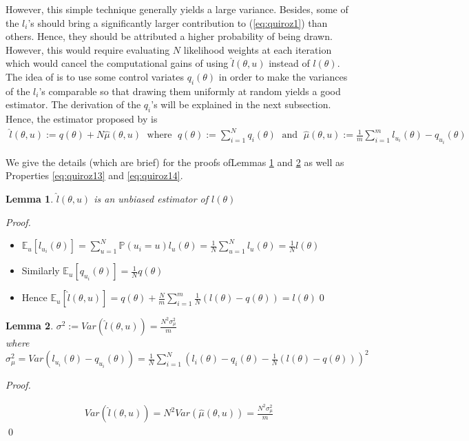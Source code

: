 \documentclass[11pt,a4paper]{report}\usepackage[]{graphicx}\usepackage[]{color}
\newtheorem{lemma}{Lemma}[section]
\begin{document}
However, this simple technique generally yields a large variance. Besides, some of the $l_i$'s should bring a significantly larger contribution to (\ref{eq:quiroz1}) than others. Hence, they should be attributed a higher probability of being drawn. However, this would require evaluating $N$ likelihood weights at each iteration which would cancel the computational gains of using $\hat l(\theta,u)$ instead of $l(\theta)$. The idea of \cite{quiroz2018speeding} is to use some control variates $q_i(\theta)$ in order to make the variances of the $l_i$'s comparable so that drawing them uniformly at random yields a good estimator. The derivation of the $q_i$'s will be explained in the next subsection.\\
Hence, the estimator proposed by \cite{quiroz2018speeding} is 
\begin{align}
\label{eq:quiroz3}
\hat l(\theta,u):= q(\theta) + N\hat\mu(\theta,u)\; \text{ where }\; q(\theta):=\sum_{i=1}^N q_i(\theta)\; \text{ and }\; \hat\mu(\theta,u):=\frac{1}{m}\sum_{i=1}^m l_{u_i}(\theta)-q_{u_i}(\theta)
\end{align}

We give the details (which are brief) for the proofs ofLemmas \ref{eq:quiroz11} and \ref{eq:quiroz12} as well as Properties \ref{eq:quiroz13} and \ref{eq:quiroz14}.
\begin{lemma}
\label{eq:quiroz11}
$\hat l(\theta,u)$ is an unbiased estimator of $l(\theta)$
\end{lemma}
\noindent\textit{Proof.}
\begin{itemize}
\item $\mathbb{E}_u[l_{u_i}(\theta)]=\sum_{u=1}^N \mathbb P(u_i=u)l_{u}(\theta)=\frac1N\sum_{u=1}^N l_{u}(\theta)=\frac1Nl(\theta)$
\item Similarly $\mathbb{E}_u[q_{u_i}(\theta)]=\frac1Nq(\theta)$ 
\item Hence $\mathbb{E}_u[\hat l(\theta,u)]=q(\theta)+\frac Nm \sum_{i=1}^m \frac1N(l(\theta)-q(\theta))=l(\theta)$\qed
\end{itemize}

\begin{lemma}
\label{eq:quiroz12}
$\sigma^2:= Var(\hat l(\theta,u))=\frac{N^2\sigma_{\mu}^2}{m}$\\ where $\sigma_{\mu}^2=Var(l_{u_i}(\theta)-q_{u_i}(\theta))=\frac1N\sum_{i=1}^N(l_i(\theta)-q_i(\theta)-\frac1N(l(\theta)-q(\theta)))^2$
\end{lemma}
\noindent\textit{Proof.}

\begin{align*}
Var(\hat l(\theta,u))=N^2Var(\hat\mu(\theta,u))=\frac{N^2\sigma_{\mu}^2}{m}
\end{align*}\qed
\end{document}
